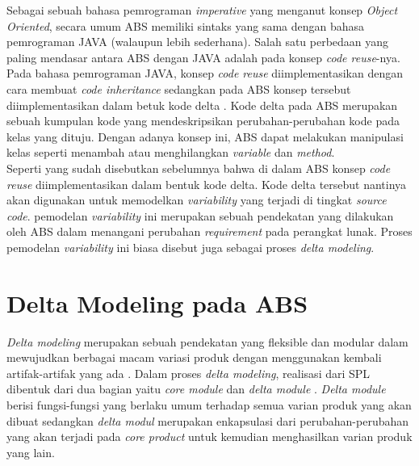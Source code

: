 Sebagai sebuah bahasa pemrograman \textit{imperative} yang menganut konsep \textit{Object Oriented}, secara umum ABS memiliki sintaks yang sama dengan bahasa pemrograman JAVA (walaupun lebih sederhana). Salah satu perbedaan yang paling mendasar antara ABS dengan JAVA adalah pada konsep \textit{code reuse}-nya. Pada bahasa pemrograman JAVA, konsep \textit{code reuse} diimplementasikan dengan cara membuat \textit{code inheritance} sedangkan pada ABS konsep tersebut diimplementasikan dalam betuk kode delta \citep{hahnle2013hats}. Kode delta pada ABS merupakan sebuah kumpulan kode yang mendeskripsikan perubahan-perubahan kode pada kelas yang dituju. Dengan adanya konsep ini, ABS dapat melakukan manipulasi kelas seperti menambah atau menghilangkan \textit{variable} dan \textit{method}. \\

Seperti yang sudah disebutkan sebelumnya bahwa di dalam ABS konsep \textit{code reuse} diimplementasikan dalam bentuk kode delta. Kode delta tersebut nantinya akan digunakan untuk memodelkan \textit{variability} yang terjadi di tingkat \textit{source code}. pemodelan \textit{variability} ini merupakan sebuah pendekatan yang dilakukan oleh ABS dalam menangani perubahan \textit{requirement} pada perangkat lunak. Proses pemodelan \textit{variability} ini biasa disebut juga sebagai proses \textit{delta modeling}. \\

\section{Delta Modeling pada ABS}

\textit{Delta modeling} merupakan sebuah pendekatan yang fleksible dan modular dalam mewujudkan berbagai macam variasi produk dengan menggunakan kembali artifak-artifak yang ada \citep{hahnle2013hats}. Dalam proses \textit{delta modeling}, realisasi dari SPL dibentuk dari dua bagian yaitu \textit{core module} dan \textit{delta module} \cite{haber2011delta}. \textit{Delta module} berisi fungsi-fungsi yang berlaku umum terhadap semua varian produk yang akan dibuat sedangkan \textit{delta modul} merupakan enkapsulasi dari perubahan-perubahan yang akan terjadi pada \textit{core product} untuk kemudian menghasilkan varian produk yang lain.\\

